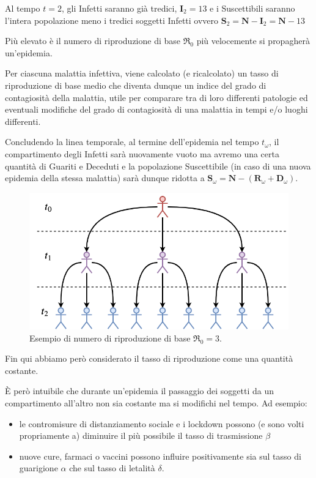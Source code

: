 \documentclass[11pt]{article}
\begin{document}
Al tempo \(t=2\), gli Infetti saranno già tredici, \(\mathbf{I}_2 = 13\)
e i Suscettibili saranno l'intera popolazione meno i tredici soggetti
Infetti ovvero
\(\mathbf{S}_2 = \mathbf{N} - \mathbf{I}_2 = \mathbf{N} - 13\)

Più elevato è il numero di riproduzione di base \(\Re_0\) più
velocemente si propagherà un'epidemia.

Per ciascuna malattia infettiva, viene calcolato (e ricalcolato) un
tasso di riproduzione di base medio che diventa dunque un indice del
grado di contagiosità della malattia, utile per comparare tra di loro
differenti patologie ed eventuali modifiche del grado di contagiosità di
una malattia in tempi e/o luoghi differenti.

Concludendo la linea temporale, al termine dell'epidemia nel tempo
\(t_{\omega}\), il compartimento degli Infetti sarà nuovamente vuoto ma
avremo una certa quantità di Guariti e Deceduti e la popolazione
Suscettibile (in caso di una nuova epidemia della stessa malattia) sarà
dunque ridotta a
\(\mathbf{S}_{\omega} = \mathbf{N} - (\mathbf{R}_{\omega} + \mathbf{D}_{\omega})\).

    \begin{figure}
\centering
\includegraphics{images/r0.png}
\caption{Esempio di numero di riproduzione di base \(\Re_0 = 3\).}
\label{fig:r0ex}
\end{figure}

    Fin qui abbiamo però considerato il tasso di riproduzione come una
quantità costante.

È però intuibile che durante un'epidemia il passaggio dei soggetti da un
compartimento all'altro non sia costante ma si modifichi nel tempo. Ad
esempio:

\begin{itemize}
\item
  le contromisure di distanziamento sociale e i lockdown possono (e sono
  volti propriamente a) diminuire il più possibile il tasso di
  trasmissione \(\beta\)
\item
  nuove cure, farmaci o vaccini possono influire positivamente sia sul
  tasso di guarigione \(\alpha\) che sul tasso di letalità \(\delta\).
\end{itemize}
\end{document}
